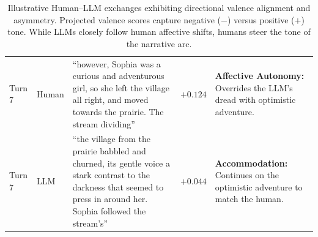 \documentclass[11pt]{article}
\begin{document}
\begin{table}[t]
\begin{tabularx}{\textwidth}{l l Y r Y}
\addlinespace[2pt]
Turn 7 & Human & ``however, Sophia was a curious and adventurous girl, so she left the village all right, and moved towards the prairie. The stream dividing'' & $+0.124$ & \textbf{Affective Autonomy:} Overrides the LLM's dread with optimistic adventure. \\
\addlinespace[2pt]
Turn 7 & LLM & ``the village from the prairie babbled and churned, its gentle voice a stark contrast to the darkness that seemed to press in around her. Sophia followed the stream's'' & $+0.044$ & \textbf{Accommodation:} Continues on the optimistic adventure to match the human. \\
\bottomrule
\end{tabularx}
\caption{Illustrative Human--LLM exchanges exhibiting directional valence alignment and asymmetry. Projected valence scores capture negative ($-$) versus positive ($+$) tone. While LLMs closely follow human affective shifts, humans steer the tone of the narrative arc.}
\label{tab:valence-excerpt}
\end{table}
\end{document}
